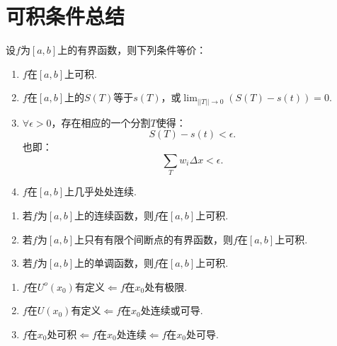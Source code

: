 \section{可积条件总结}

\begin{theorem}[可积的充要条件]
	设$f$为$[a,b]$上的有界函数，则下列条件等价：
	\begin{enumerate}
		\item $f$在$[a,b]$上可积.
		\item $f$在$[a,b]$上的$S(T)$等于$s(T)$，或$\displaystyle\lim_{||T||\to 0}(S(T)-s(t))=0.$
		\item $\forall\epsilon>0$，存在相应的一个分割$T$使得：
		\begin{equation}
			S(T)-s(t)<\epsilon.
		\end{equation}
		也即：
		\begin{equation}
			\displaystyle\sum_{T}w_i\Delta{x}<\epsilon.
		\end{equation}
		\item $f$在$[a,b]$上几乎处处连续.
	\end{enumerate}
\end{theorem}

\begin{theorem}[可积函数类]
	\begin{enumerate}
		\item 若$f$为$[a,b]$上的连续函数，则$f$在$[a,b]$上可积.
		\item 若$f$为$[a,b]$上只有有限个间断点的有界函数，则$f$在$[a,b]$上可积.
		\item 若$f$为$[a,b]$上的单调函数，则$f$在$[a,b]$上可积.
	\end{enumerate}
\end{theorem}

\begin{proposition}
	\begin{enumerate}
		\item $f$在$U^o(x_0)$有定义$\Leftarrow f$在$x_0$处有极限.
		\item $f$在$U(x_0)$有定义$\Leftarrow f$在$x_0$处连续或可导.
		\item $f$在$x_0$处可积$\Leftarrow f$在$x_0$处连续$\Leftarrow f$在$x_0$处可导.
	\end{enumerate}
\end{proposition}